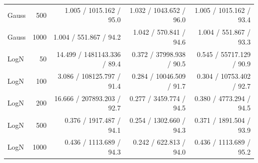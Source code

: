 \begin{table}[t]
\begin{tabular}{lrrrr}
Gauss & 500 & 1.005 / 1015.162 / 95.0 & 1.032 / 1043.652 / 96.0 & 1.005 / 1015.162 / 93.4 \\
Gauss & 1000 & 1.004 / 551.867 / 94.2 & 1.042 / 570.841 / 94.6 & 1.004 / 551.867 / 93.3 \\
LogN & 50 & 14.499 / 1481143.336 / 89.4 & 0.372 / 37998.938 / 90.5 & 0.545 / 55717.129 / 90.9 \\
LogN & 100 & 3.086 / 108125.797 / 91.4 & 0.284 / 10046.509 / 91.7 & 0.304 / 10753.402 / 92.7 \\
LogN & 200 & 16.666 / 207893.203 / 92.7 & 0.277 / 3459.774 / 94.5 & 0.380 / 4773.294 / 94.5 \\
LogN & 500 & 0.376 / 1917.487 / 94.1 & 0.254 / 1302.660 / 94.3 & 0.371 / 1891.504 / 93.9 \\
LogN & 1000 & 0.436 / 1113.689 / 94.3 & 0.242 / 622.813 / 94.0 & 0.436 / 1113.689 / 95.2 \\
\bottomrule
\end{tabular}
\end{table}
